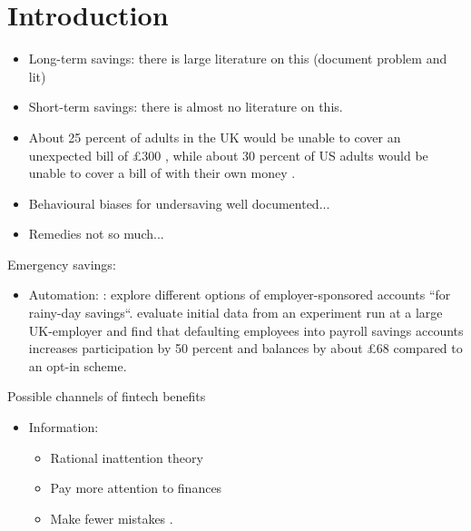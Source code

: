 
\section{Introduction}%
\label{sec:introduction}


\begin{itemize}
    \item Long-term savings: there is large literature on this (document
        problem and lit)

    \item Short-term savings: there is almost no literature on this.

    \item About 25 percent of adults in the UK would be unable to cover an
        unexpected bill of \pounds300 \citep{philipps2021supporting}, while
        about 30 percent of US adults would be unable to cover a bill of with
        their own money \citep{fed2022economic}.

    \item Behavioural biases for undersaving well documented...

    \item Remedies not so much...

\end{itemize}


Emergency savings:
\begin{itemize}

    \item Automation: \citet{beshears2020building}: explore different options
        of employer-sponsored accounts ``for rainy-day savings``.
        \citet{berk2022automating} evaluate initial data from an experiment run
        at a large UK-employer and find that defaulting employees into payroll
        savings accounts increases participation by 50 percent and balances by
        about \pounds68 compared to an opt-in scheme.

\end{itemize}

Possible channels of fintech benefits
\begin{itemize}
    
    \item Information: \citet{levi2020mind}
        \begin{itemize}

            \item Rational inattention theory

            \item Pay more attention to finances \citet{stango2014limited,
                medina2021side, bursztyn2019moral}

            \item Make fewer mistakes \citet{stango2009consumers,
                jorring2020financial}.
        \end{itemize}

\end{itemize}

